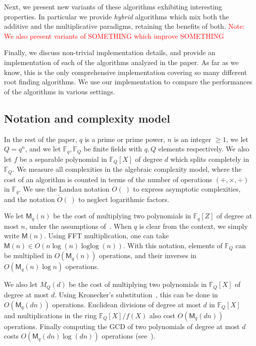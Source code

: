 \documentclass{article}
\newcommand{\ff}[1]{\mathbb{F}_{#1}}
\DeclareMathOperator{\loglog}{loglog}
\newcommand{\bigOt}{\tilde{O}}
\newcommand{\Mul}{\mathsf{M}}
\newcounter{algo}
\newcommand{\Notes}[1]{\textcolor{red}{Note: #1}}
\begin{document}
Next, we present new variants of these algorithms exhibiting
interesting properties. In particular we provide \emph{hybrid}
algorithms which mix both the additive and the multiplicative
paradigms, retaining the benefits of both. \Notes{We also present
  variants of SOMETHING which improve SOMETHING}

Finally, we discuss non-trivial implementation details, and provide an
implementation of each of the algorithms analyzed in the paper. As far
as we know, this is the only comprehensive implementation covering so
many different root finding algorithms. We use our implementation to
compare the performances of the algorithms in various settings.


\subsection{Notation and complexity model}
\label{sec:compl-model-fund}

In the rest of the paper, $q$ is a prime or prime power, $n$ is an
integer $≥1$, we let $Q=q^n$, and we let $\ff{q},\ff{Q}$ be finite
fields with $q,Q$ elements respectively.  We also let $f$ be a
separable polynomial in $\ff{Q}[X]$ of degree $d$ which splits
completely in $\ff{Q}$. We measure all complexities in the algebraic
complexity model, where the cost of an algorithm is counted in terms
of the number of operations $(+,\times,\div)$ in $\ff{q}$. We use the
Landau notation $O(\ )$ to express asymptotic complexities, and the
notation $\bigOt(\ )$ to neglect logarithmic factors.

We let $\Mul_q(n)$ be the cost of multiplying two polynomials in
$\ff{q}[Z]$ of degree at most $n$, under the assumptions
of~\cite[Chapter~8.3]{Gathen2003}. When $q$ is clear from the context,
we simply write $\Mul(n)$.  Using FFT multiplication, one can take
$\Mul(n)∈ O(n\log(n)\loglog(n))$.  With this notation, elements of
$\ff{Q}$ can be multiplied in $O(\Mul_q(n))$ operations, and their
inverses in $O(\Mul_q(n)\log n)$ operations.

We also let $M_Q(d)$ be the cost of multiplying two polynomials in
$\ff{Q}[X]$ of degree at most $d$.  Using Kronecker's
substitution~\cite{moenck76,kaltofen87,Gathen2003,GathenS92,harvey09},
this can be done in $O(\Mul_q(dn))$ operations. Euclidean divisions of
degree at most $d$ in $\ff{Q}[X]$ and multiplications in the ring
$\ff{Q}[X]/f(X)$ also cost $O(\Mul_q(dn))$ operations. Finally
computing the GCD of two polynomials of degree at most $d$ costs
$O(\Mul_q(dn)\log(dn))$ operations
(see~\cite[Th.~11.5]{Gathen2003}).
\end{document}
